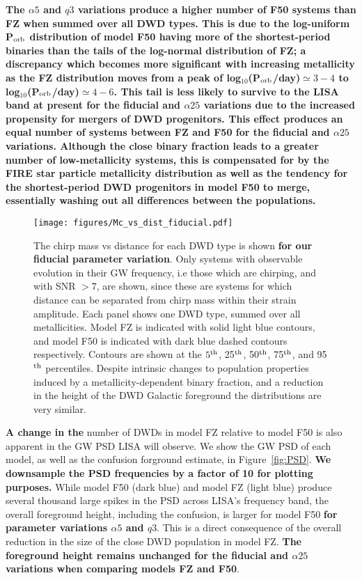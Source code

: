 \documentclass[twocolumn, linenumbers]{aastex631}
\begin{document}
\textbf{The $\alpha5$ and $q3$ variations produce a higher number of F50 systems than FZ when summed over all DWD types. This is due to the log-uniform P$_{\rm{orb}}$ distribution of model F50 having more of the shortest-period binaries than the tails of the log-normal distribution of FZ; a discrepancy which becomes more significant with increasing metallicity as the FZ distribution moves from a peak of log$_{10}$(P$_{\rm{orb}}$/day)$\simeq 3-4$ to log$_{10}$(P$_{\rm{orb}}$/day)$\simeq 4-6$. This tail is less likely to survive to the LISA band at present for the fiducial and $\alpha25$ variations due to the increased propensity for mergers of DWD progenitors. This effect produces an equal number of systems between FZ and F50 for the fiducial and $\alpha25$ variations. Although the close binary fraction leads to a greater number of low-metallicity systems, this is compensated for by the FIRE star particle metallicity distribution as well as the tendency for the shortest-period DWD progenitors in model F50 to merge, essentially washing out all differences between the populations.}

\begin{figure*}
	\texttt{[image: figures/Mc\_vs\_dist\_fiducial.pdf]}
    \caption{The chirp mass vs distance for each DWD type is shown \textbf{for our fiducial parameter variation}. Only systems with observable evolution in their GW frequency, i.e those which are chirping, and with SNR $>7$, are shown, since these are systems for which distance can be separated from chirp mass within their strain amplitude. Each panel shows one DWD type, summed over all metallicities. Model FZ is indicated with solid light blue contours, and model F50 is indicated with dark blue dashed contours respectively. Contours are shown at the $5^{\rm{th}}$, 25$^{\rm{th}}$, 50$^{\rm{th}}$, 75$^{\rm{th}}$, and 95$^{\rm{th}}$ percentiles. Despite intrinsic changes to population properties induced by a metallicity-dependent binary fraction, and a reduction in the height of the DWD Galactic foreground the distributions are very similar.}
    \label{fig:Mc_vs_dist}
\end{figure*}

\textbf{A change in the} number of DWDs in model FZ relative to model F50 is also apparent in the GW PSD LISA will observe. We show the GW PSD of each model, as well as the confusion forground estimate, in Figure~\ref{fig:PSD}. \textbf{We downsample the PSD frequencies by a factor of 10 for plotting purposes.} While model F50 (dark blue) and model FZ (light blue) produce several thousand large spikes in the PSD across LISA's frequency band, the overall foreground height, including the confusion, is larger for model F50 \textbf{for parameter variations $\alpha5$ and $q3$}. This is a direct consequence of the overall reduction in the size of the close DWD population in model FZ. \textbf{The foreground height remains unchanged for the fiducial and $\alpha25$ variations when comparing models FZ and F50}.
\end{document}
